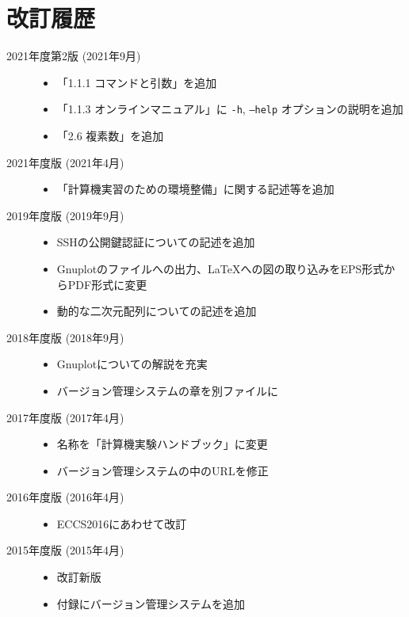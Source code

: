 \section*{改訂履歴}

\noindent
\begin{description}
\item[2021年度第2版 (2021年9月)] \mbox{}
  
  \begin{itemize}
  \item 「1.1.1 コマンドと引数」を追加
  \item 「1.1.3 オンラインマニュアル」に \texttt{-h}, \texttt{--help} オプションの説明を追加
  \item 「2.6 複素数」を追加
  \end{itemize}

\item[2021年度版 (2021年4月)] \mbox{}
  
  \begin{itemize}
  \item 「計算機実習のための環境整備」に関する記述等を追加
  \end{itemize}

\item[2019年度版 (2019年9月)] \mbox{}
  
  \begin{itemize}
  \item SSHの公開鍵認証についての記述を追加
  \item Gnuplotのファイルへの出力、\LaTeX への図の取り込みをEPS形式からPDF形式に変更
  \item 動的な二次元配列についての記述を追加
  \end{itemize}

\item[2018年度版 (2018年9月)] \mbox{}
  
  \begin{itemize}
  \item Gnuplotについての解説を充実
  \item バージョン管理システムの章を別ファイルに
  \end{itemize}

\item[2017年度版 (2017年4月)] \mbox{}
  
  \begin{itemize}
  \item 名称を「計算機実験ハンドブック」に変更
  \item バージョン管理システムの中のURLを修正
  \end{itemize}

\item[2016年度版 (2016年4月)] \mbox{}

  \begin{itemize}
  \item ECCS2016にあわせて改訂
  \end{itemize}

\item[2015年度版 (2015年4月)] \mbox{}

  \begin{itemize}
  \item 改訂新版
  \item 付録にバージョン管理システムを追加
  \end{itemize}

\end{description}
